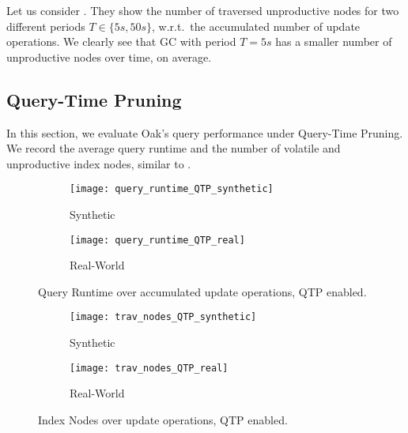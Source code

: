 \documentclass[abstracton,12pt]{scrartcl}
\theoremstyle{definition}
\begin{document}
\vspace{-0.3cm}

Let us consider 
.
They show the number of traversed unproductive nodes for two different periods
$T \in \{5s,50s\}$, w.r.t.\ the accumulated number of update operations. 
We clearly see that GC with
period $T = 5s$ has a smaller number of unproductive nodes over time, on average.

\subsection{Query-Time Pruning}

\label{sec:qtp-experiment}

In this section, we evaluate Oak's query performance under Query-Time
Pruning. We record the average query runtime and the number of volatile
and unproductive index nodes, similar to .

\begin{figure}[t]
  \centering
  \begin{subfigure}{0.49\linewidth}
    \centering
    \caption{Synthetic}
    \texttt{[image: query\_runtime\_QTP\_synthetic]}
    \label{fig:query_runtime_QTP_synthetic}
  \end{subfigure}
  \begin{subfigure}{0.49\linewidth}
    \centering
    \caption{Real-World}
    \texttt{[image: query\_runtime\_QTP\_real]}
    \label{fig:query_runtime_QTP_real}
  \end{subfigure}
  \vspace{-0.5cm}
  \caption[Query Runtime over accumulated update operations, QTP enabled]{
  Query Runtime over accumulated update operations, QTP enabled.}
\end{figure}

\begin{figure}[t]
  \centering
  \begin{subfigure}{0.49\linewidth}
    \centering
    \caption{Synthetic}
    \texttt{[image: trav\_nodes\_QTP\_synthetic]}
    \label{fig:trav_nodes_QTP_synthetic}
  \end{subfigure}
  \begin{subfigure}{0.49\linewidth}
    \centering
    \caption{Real-World}
    \texttt{[image: trav\_nodes\_QTP\_real]}
    \label{fig:trav_nodes_QTP_real}
  \end{subfigure}
  \vspace{-0.5cm}
  \caption[Index Nodes over accumulated update operations, QTP enabled]{
  Index Nodes over update operations, QTP enabled.}
\end{figure}
\end{document}
